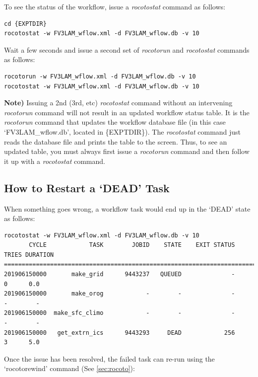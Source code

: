 \documentclass[11pt,fleqn]{report}              %
\begin{document}
To see the status of the workflow, issue a {\it rocotostat} command as follows:
\lstset{language=bash}   
\begin{lstlisting}[frame=trBL]
cd {EXPTDIR}
rocotostat -w FV3LAM_wflow.xml -d FV3LAM_wflow.db -v 10
\end{lstlisting}

Wait a few seconds and issue a second set of {\it rocotorun} and {\it rocotostat} commands as follows:
\lstset{language=bash}   
\begin{lstlisting}[frame=trBL]
rocotorun -w FV3LAM_wflow.xml -d FV3LAM_wflow.db -v 10
rocotostat -w FV3LAM_wflow.xml -d FV3LAM_wflow.db -v 10
\end{lstlisting}

{\bf Note)} Issuing a 2nd (3rd, etc) {\it rocotostat} command without an intervening {\it rocotorun} command will not result in an updated workflow status table. It is the {\it rocotorun} command that updates the workflow database file (in this case `FV3LAM\_wflow.db', located in \{EXPTDIR\}). The {\it rocotostat} command just reads the database file and prints the table to the screen.  Thus, to see an updated table, you must always first issue a {\it rocotorun} command and then follow it up with a {\it rocotostat} command.



\subsection{How to Restart a `DEAD' Task}
\label{subsec:restart_dead_task}

When something goes wrong, a workflow task would end up in the `DEAD' state as follows:

\lstset{language=bash}   
\begin{lstlisting}[frame=trBL]
rocotostat -w FV3LAM_wflow.xml -d FV3LAM_wflow.db -v 10
       CYCLE            TASK        JOBID    STATE    EXIT STATUS  TRIES DURATION
=================================================================================
201906150000       make_grid      9443237   QUEUED              -      0      0.0
201906150000       make_orog            -        -              -      -        -
201906150000  make_sfc_climo            -        -              -      -        -
201906150000   get_extrn_ics      9443293     DEAD            256      3      5.0
\end{lstlisting}

Once the issue has been resolved, the failed task can re-run using the `rocotorewind' command (See \ref{sec:rocoto}):
\end{document}
